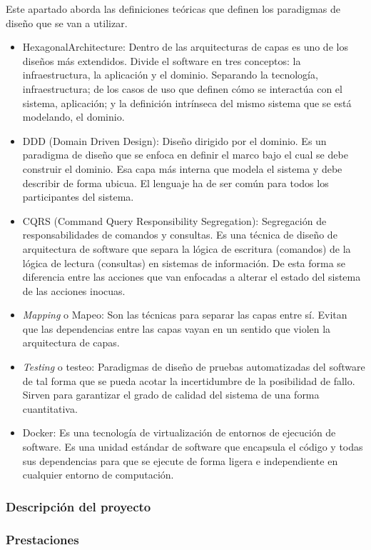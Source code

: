 Este apartado aborda las definiciones teóricas que definen los paradigmas de diseño que se van a utilizar.

\begin{itemize}
    \item \gls{HexagonalArchitecture}: Dentro de las arquitecturas de capas es uno de los diseños más extendidos.
    Divide el software en tres conceptos: la infraestructura, la aplicación y el dominio.
    Separando la tecnología, infraestructura;
    de los casos de uso que definen cómo se interactúa con el sistema, aplicación;
    y la definición intrínseca del mismo sistema que se está modelando, el dominio.
    \item \gls{DDD} (Domain Driven Design): Diseño dirigido por el dominio.
    Es un paradigma de diseño que se enfoca en definir el marco bajo el cual se debe construir el dominio.
    Esa capa más interna que modela el sistema y debe describir de forma ubicua.
    El lenguaje ha de ser común para todos los participantes del sistema.
    \item \gls{CQRS} (Command Query Responsibility Segregation): Segregación de responsabilidades de comandos y consultas.
    Es una técnica de diseño de arquitectura de software que separa la lógica de escritura (comandos) de la lógica de lectura (consultas) en sistemas de información.
    De esta forma se diferencia entre las acciones que van enfocadas a alterar el estado del sistema de las acciones inocuas.
    \item \textit{Mapping} o Mapeo:
    Son las técnicas para separar las capas entre sí.
    Evitan que las dependencias entre las capas vayan en un sentido que violen la arquitectura de capas.
    \item \textit{Testing} o testeo:
    Paradigmas de diseño de pruebas automatizadas del software de tal forma que se pueda acotar la incertidumbre de la posibilidad de fallo.
    Sirven para garantizar el grado de calidad del sistema de una forma cuantitativa.
    \item Docker:
    Es una tecnología de virtualización de entornos de ejecución de software.
    Es una unidad estándar de software que encapsula el código y todas sus dependencias para que se ejecute de forma ligera e independiente en cualquier entorno de computación.
\end{itemize}



\subsubsection{Descripción del proyecto}


\subsubsection{Prestaciones}

